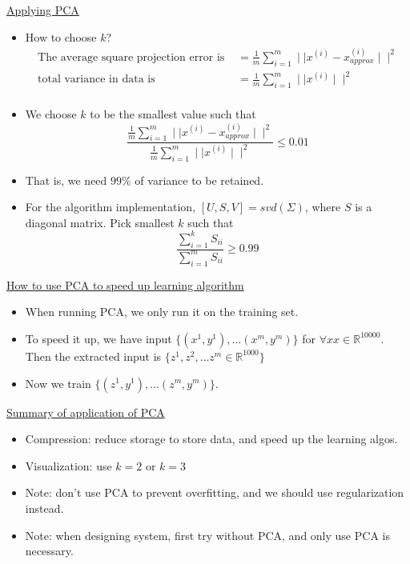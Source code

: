 \documentclass[12pt]{article}
\begin{document}
\underline{Applying PCA}
\begin{itemize}
	\item How to choose $k$?
	\begin{align*}
	\text{The average square projection error is }&=\frac{1}{m}\sum_{i=1}^{m}\mid\mid x^{(i)}-x_{approx}^{(i)}\mid\mid ^2\\
	\text{total variance in data is }&=\frac{1}{m}\sum_{i=1}^{m}\mid\mid x^{(i)} \mid\mid ^2\\
	\end{align*}
		\item We choose $k$ to be the smallest value such that
		\[\frac{ \frac{1}{m}\sum_{i=1}^{m}\mid\mid x^{(i)}-x_{approx}^{(i)}\mid\mid ^2}{\frac{1}{m}\sum_{i=1}^{m}\mid\mid x^{(i)} \mid\mid ^2} \leq 0.01\]
		\item That is, we need $99\%$ of variance to be retained.
		\item For the algorithm implementation, $[U,S,V] = svd(\Sigma)$, where $S$ is a diagonal matrix. Pick smallest $k$ such that
		\[ \frac{\sum_{i=1}^{k}S_{ii}}{\sum_{i=1}^{m}S_{ii}} \geq0.99\]
\end{itemize}

\underline{How to use PCA to speed up learning algorithm}

\begin{itemize}
	\item When running PCA, we only run it on the training set.
	\item To speed it up, we have input $\{(x^1,y^1),\ldots (x^m,y^m) \}$ for $\forall x x\in\mathbb{R}^{10000}$. Then the extracted input is $\{z^1,z^2,\ldots z^m\in \mathbb{R}^{1000}\}$\\
	\item Now we train $\{(z^1,y^1),\ldots (z^m,y^m) \}$.
	
\end{itemize}

\underline{Summary of application of PCA}

\begin{itemize}
	\item Compression: reduce storage to store data, and speed up the learning algos.
	\item Visualization: use $k=2$ or $k=3$
	\item Note: don't use PCA to prevent overfitting, and we should use regularization instead.
	\item Note: when designing system, first try without PCA, and only use PCA is necessary.
\end{itemize}
\end{document}
